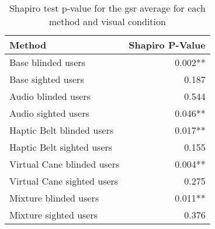 
\begin{table}[!htb]
\centering
\caption{Shapiro test p-value for the gsr average for each method and visual condition}
\label{tab:shapiro_gsr_avg}
\begin{tabular}{lr}
\toprule
                    Method & Shapiro P-Value \\
\midrule
        Base blinded users &         0.002** \\
        Base sighted users &           0.187 \\
       Audio blinded users &           0.544 \\
       Audio sighted users &         0.046** \\
 Haptic Belt blinded users &         0.017** \\
 Haptic Belt sighted users &           0.155 \\
Virtual Cane blinded users &         0.004** \\
Virtual Cane sighted users &           0.275 \\
     Mixture blinded users &         0.011** \\
     Mixture sighted users &           0.376 \\
\bottomrule
\end{tabular}
\end{table}


